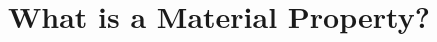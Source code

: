 %




\renewcommand{\chaptergraphicspath}{../src/MaterialProperty/eps/}

\chapterimage{\noheaderimage}

\chapter{What is a Material Property?\label{chap:MaterialProperty}}

